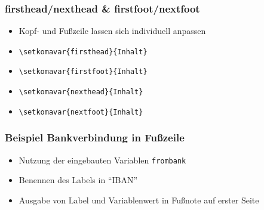 \documentclass[12pt,ngerman]{beamer}
\begin{document}
\begin{frame}[containsverbatim]
\frametitle{firsthead/nexthead \& firstfoot/nextfoot}

\begin{itemize}
\item Kopf- und Fußzeile lassen sich individuell anpassen
\item \verb|\setkomavar{firsthead}{Inhalt}|
\item \verb|\setkomavar{firstfoot}{Inhalt}|
\item \verb|\setkomavar{nexthead}{Inhalt}|
\item \verb|\setkomavar{nextfoot}{Inhalt}|
\end{itemize}
\end{frame}

\begin{frame}[fragile]
\frametitle{Beispiel Bankverbindung in Fußzeile}

\begin{itemize}
	\item Nutzung der eingebauten Variablen \texttt{frombank}
	\item Benennen des Labels in \enquote{IBAN}
	\item Ausgabe von Label und Variablenwert in Fußnote auf erster Seite
\end{itemize}



\end{frame}
\end{document}

